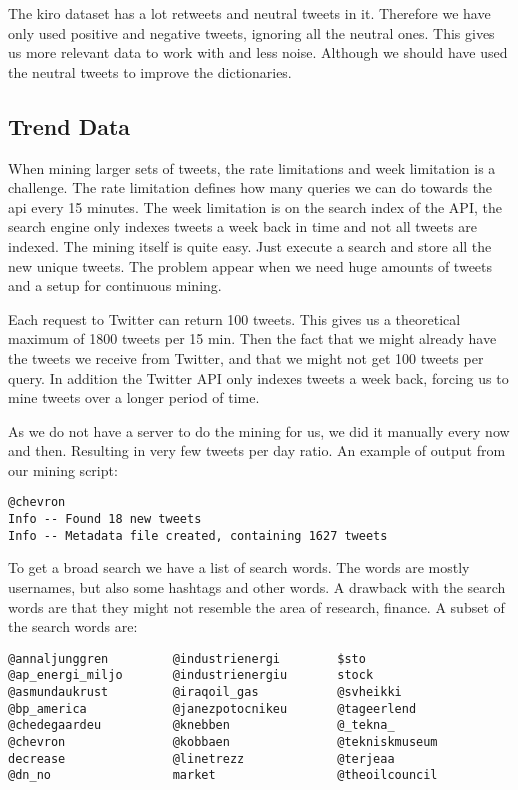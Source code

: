 The kiro dataset has a lot retweets and neutral tweets in it. Therefore we have
only used positive and negative tweets, ignoring all the neutral ones.
This gives us more relevant data to work with and less noise. Although we
should have used the neutral tweets to improve the dictionaries.
%

\subsection{Trend Data}\label{data:trend_data}
When mining larger sets of tweets, the rate limitations and week limitation is
a challenge. The rate limitation defines how many queries we can do towards the
api every 15 minutes. The week limitation is on the search index of the API,
the search engine only indexes tweets a week back in time and not all tweets
are indexed. The mining itself is quite easy. Just execute a search and store
all the new unique tweets. The problem appear when we need huge amounts of
tweets and a setup for continuous mining. 

Each request to Twitter can return 100 tweets. This gives us a theoretical
maximum of 1800 tweets per 15 min. Then the fact that we
might already have the tweets we receive from Twitter, and that we might not
get 100 tweets per query. In addition the Twitter API only indexes tweets a
week back, forcing us to mine tweets over a longer period of time.  

As we do not have a server to do the mining for us, we did it manually
every now and then. Resulting in very few tweets per day ratio. 
An example of output from our mining script:
\begin{verbatim}
@chevron
Info -- Found 18 new tweets
Info -- Metadata file created, containing 1627 tweets
\end{verbatim} 

To get a broad search we have a list of search words. The words are mostly
usernames, but also some hashtags and other words. A drawback with the search
words are that they might not resemble the area of research, finance.  
A subset of the search words are:
\begin{verbatim}
@annaljunggren         @industrienergi        $sto
@ap_energi_miljo       @industrienergiu       stock
@asmundaukrust         @iraqoil_gas           @svheikki
@bp_america            @janezpotocnikeu       @tageerlend
@chedegaardeu          @knebben               @_tekna_
@chevron               @kobbaen               @tekniskmuseum
decrease               @linetrezz             @terjeaa
@dn_no                 market                 @theoilcouncil
\end{verbatim}

